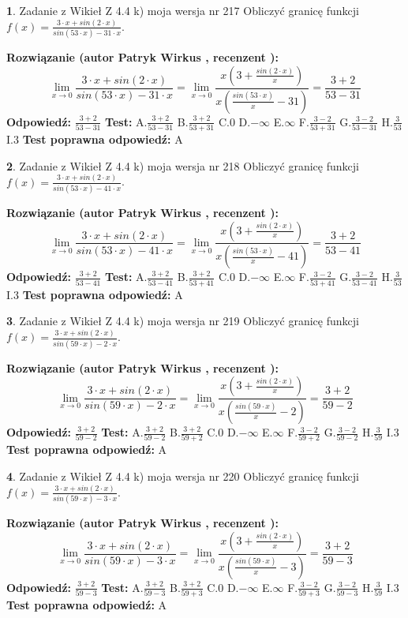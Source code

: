 \documentclass[12pt, a4paper]{article}
\theoremstyle{definition} %
\newtheorem{zad}{}
\newcommand{\zadStart}[1]{\begin{zad}#1\newline}
\newcommand{\zadStop}{\end{zad}}
\newcommand{\rozwStart}[2]{\noindent \textbf{Rozwiązanie (autor #1 , recenzent #2): }\newline}
\newcommand{\rozwStop}{\newline}
\newcommand{\odpStart}{\noindent \textbf{Odpowiedź:}\newline}
\newcommand{\odpStop}{\newline}
\newcommand{\testStart}{\noindent \textbf{Test:}\newline}
\newcommand{\testStop}{\newline}
\newcommand{\kluczStart}{\noindent \textbf{Test poprawna odpowiedź:}\newline}
\newcommand{\kluczStop}{\newline}
\begin{document}
\zadStart{Zadanie z Wikieł Z 4.4 k) moja wersja nr 217}
Obliczyć granicę funkcji $f(x)=\frac{3\cdot x +sin(2\cdot x)}{sin(53\cdot x) -31\cdot x}$.
\zadStop
\rozwStart{Patryk Wirkus}{}
$$\lim\limits_{x\to 0}\frac{3\cdot x +sin(2\cdot x)}{sin(53\cdot x) -31\cdot x}
=\lim\limits_{x\to 0}\frac{x(3+\frac{sin(2\cdot x)}{x})}{x(\frac{sin(53\cdot x)}{x}-31)}
=\frac{3+2}{53-31}$$
\rozwStop
\odpStart
$\frac{3+2}{53-31}$
\odpStop
\testStart
A.$\frac{3+2}{53-31}$
B.$\frac{3+2}{53+31}$
C.$0$
D.$-\infty$
E.$\infty$
F.$\frac{3-2}{53+31}$
G.$\frac{3-2}{53-31}$
H.$\frac{3}{53}$
I.$3$
\testStop
\kluczStart
A
\kluczStop



\zadStart{Zadanie z Wikieł Z 4.4 k) moja wersja nr 218}
Obliczyć granicę funkcji $f(x)=\frac{3\cdot x +sin(2\cdot x)}{sin(53\cdot x) -41\cdot x}$.
\zadStop
\rozwStart{Patryk Wirkus}{}
$$\lim\limits_{x\to 0}\frac{3\cdot x +sin(2\cdot x)}{sin(53\cdot x) -41\cdot x}
=\lim\limits_{x\to 0}\frac{x(3+\frac{sin(2\cdot x)}{x})}{x(\frac{sin(53\cdot x)}{x}-41)}
=\frac{3+2}{53-41}$$
\rozwStop
\odpStart
$\frac{3+2}{53-41}$
\odpStop
\testStart
A.$\frac{3+2}{53-41}$
B.$\frac{3+2}{53+41}$
C.$0$
D.$-\infty$
E.$\infty$
F.$\frac{3-2}{53+41}$
G.$\frac{3-2}{53-41}$
H.$\frac{3}{53}$
I.$3$
\testStop
\kluczStart
A
\kluczStop



\zadStart{Zadanie z Wikieł Z 4.4 k) moja wersja nr 219}
Obliczyć granicę funkcji $f(x)=\frac{3\cdot x +sin(2\cdot x)}{sin(59\cdot x) -2\cdot x}$.
\zadStop
\rozwStart{Patryk Wirkus}{}
$$\lim\limits_{x\to 0}\frac{3\cdot x +sin(2\cdot x)}{sin(59\cdot x) -2\cdot x}
=\lim\limits_{x\to 0}\frac{x(3+\frac{sin(2\cdot x)}{x})}{x(\frac{sin(59\cdot x)}{x}-2)}
=\frac{3+2}{59-2}$$
\rozwStop
\odpStart
$\frac{3+2}{59-2}$
\odpStop
\testStart
A.$\frac{3+2}{59-2}$
B.$\frac{3+2}{59+2}$
C.$0$
D.$-\infty$
E.$\infty$
F.$\frac{3-2}{59+2}$
G.$\frac{3-2}{59-2}$
H.$\frac{3}{59}$
I.$3$
\testStop
\kluczStart
A
\kluczStop



\zadStart{Zadanie z Wikieł Z 4.4 k) moja wersja nr 220}
Obliczyć granicę funkcji $f(x)=\frac{3\cdot x +sin(2\cdot x)}{sin(59\cdot x) -3\cdot x}$.
\zadStop
\rozwStart{Patryk Wirkus}{}
$$\lim\limits_{x\to 0}\frac{3\cdot x +sin(2\cdot x)}{sin(59\cdot x) -3\cdot x}
=\lim\limits_{x\to 0}\frac{x(3+\frac{sin(2\cdot x)}{x})}{x(\frac{sin(59\cdot x)}{x}-3)}
=\frac{3+2}{59-3}$$
\rozwStop
\odpStart
$\frac{3+2}{59-3}$
\odpStop
\testStart
A.$\frac{3+2}{59-3}$
B.$\frac{3+2}{59+3}$
C.$0$
D.$-\infty$
E.$\infty$
F.$\frac{3-2}{59+3}$
G.$\frac{3-2}{59-3}$
H.$\frac{3}{59}$
I.$3$
\testStop
\kluczStart
A
\kluczStop
\end{document}
